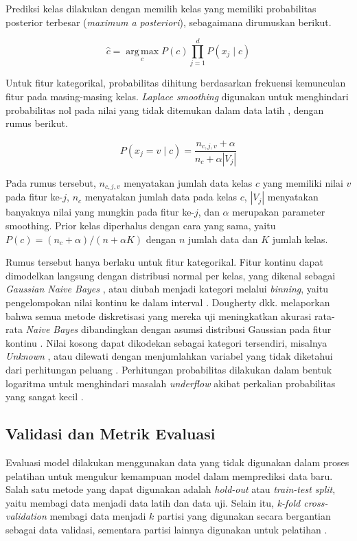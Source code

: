 Prediksi kelas dilakukan dengan memilih kelas yang memiliki probabilitas posterior terbesar (\textit{maximum a posteriori}), sebagaimana dirumuskan berikut.

\[
\hat{c}=
\operatorname*{arg\,max}_{c}
P(c)\prod_{j=1}^{d}P(x_j\mid c)
\]

Untuk fitur kategorikal, probabilitas dihitung berdasarkan frekuensi kemunculan fitur pada masing-masing kelas. \textit{Laplace smoothing} digunakan untuk menghindari probabilitas nol pada nilai yang tidak ditemukan dalam data latih \cite{ref:materi-14}, dengan rumus berikut.

\[
P(x_j=v\mid c)=
\frac{n_{c,j,v}+\alpha}
{n_c+\alpha|V_j|}
\]

Pada rumus tersebut, $n_{c,j,v}$ menyatakan jumlah data kelas $c$ yang memiliki nilai $v$ pada fitur ke-$j$, $n_c$ menyatakan jumlah data pada kelas $c$, $|V_j|$ menyatakan banyaknya nilai yang mungkin pada fitur ke-$j$, dan $\alpha$ merupakan parameter smoothing. Prior kelas diperhalus dengan cara yang sama, yaitu $P(c)=(n_c+\alpha)/(n+\alpha K)$ dengan $n$ jumlah data dan $K$ jumlah kelas.

Rumus tersebut hanya berlaku untuk fitur kategorikal. Fitur kontinu dapat dimodelkan langsung dengan distribusi normal per kelas, yang dikenal sebagai \textit{Gaussian Naive Bayes} \cite{ref:john-1995}, atau diubah menjadi kategori melalui \textit{binning}, yaitu pengelompokan nilai kontinu ke dalam interval \cite{ref:materi-09}. Dougherty dkk. melaporkan bahwa semua metode diskretisasi yang mereka uji meningkatkan akurasi rata-rata \textit{Naive Bayes} dibandingkan dengan asumsi distribusi Gaussian pada fitur kontinu \cite{ref:dougherty-1995}. Nilai kosong dapat dikodekan sebagai kategori tersendiri, misalnya \textit{Unknown} \cite{ref:materi-09}, atau dilewati dengan menjumlahkan variabel yang tidak diketahui dari perhitungan peluang \cite{ref:materi-14}. Perhitungan probabilitas dilakukan dalam bentuk logaritma untuk menghindari masalah \textit{underflow} akibat perkalian probabilitas yang sangat kecil \cite{ref:manning-2008}.

\subsection{Validasi dan Metrik Evaluasi}
Evaluasi model dilakukan menggunakan data yang tidak digunakan dalam proses pelatihan untuk mengukur kemampuan model dalam memprediksi data baru. Salah satu metode yang dapat digunakan adalah \textit{hold-out} atau \textit{train-test split}, yaitu membagi data menjadi data latih dan data uji. Selain itu, \textit{k-fold cross-validation} membagi data menjadi $k$ partisi yang digunakan secara bergantian sebagai data validasi, sementara partisi lainnya digunakan untuk pelatihan \cite{ref:materi-13}.


